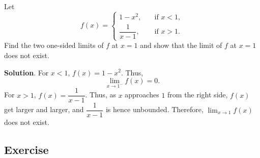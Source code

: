 \documentclass[11pt]{book}
\theoremstyle{break}
\theoremstyle{no_label}
\numberwithin{equation}{section}
\begin{document}
\begin{example}
    Let $$f(x)=\left\{\begin{array}{rl}
        1-x^2, \quad & \text{if $x<1$},\\\dfrac{1}{x-1}, \quad & \text{if $x>1$}.
    \end{array}\right.$$ Find the two one-sided limits of $f$ at $x=1$ and show that the limit of $f$ at $x=1$ does not exist.
\end{example}
\textbf{Solution}. For $x<1$, $f(x)=1-x^2$. Thus, $$\lim_{x\to1^-}f(x)=0.$$ For $x>1$, $f(x)=\dfrac{1}{x-1}$. Thus, as $x$ approaches $1$ from the right side, $f(x)$ get larger and larger, and $\dfrac{1}{x-1}$ is hence unbounded. Therefore, $\displaystyle\lim_{x\to 1}f(x)$ does not exist.

\subsection*{Exercise}
\end{document}
